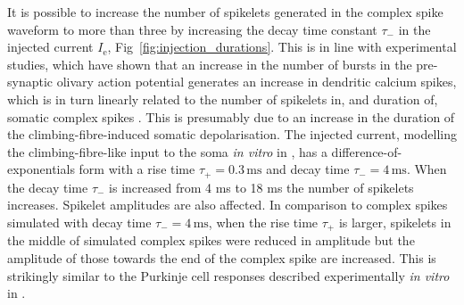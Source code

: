 \documentclass[utf8]{frontiersSCNS} %
\newcommand{\mse}{\,\mathrm{ms}}
\renewcommand{\k}{\mathrm{K}}
\newcommand{\na}{\mathrm{Na}}
\newcommand{\leak}{\mathrm{l}}
\begin{document}

It is possible to increase the
number of spikelets generated in the complex spike waveform to more
than three by increasing the decay time constant $\tau_-$ in the
injected current $I_{\mathrm{e}}$, Fig~\ref{fig:injection_durations}. This is in line with experimental studies, which have shown that an increase in the number of bursts in the pre-synaptic olivary action potential generates an increase in dendritic calcium spikes, which is in turn linearly related to the number of spikelets in, and duration of, somatic complex spikes \cite{MathyEtAl2009}. This is presumably due to an increase in the duration of the climbing-fibre-induced somatic depolarisation.
The injected current, modelling the climbing-fibre-like input to the soma
\textsl{in vitro} in \cite{DavieEtAl2008}, has a
difference-of-exponentials form with a rise time $\tau_+=0.3\mse$ and
decay time $\tau_-=4\mse$. When the decay time $\tau_-$ is increased
from 4 ms to 18 ms the number of spikelets increases. Spikelet
amplitudes are also affected. In comparison to complex spikes
simulated with decay time $\tau_- = 4\mse$, when the rise time
$\tau_+$ is larger, spikelets in the middle of simulated complex
spikes were reduced in amplitude but the amplitude of those towards
the end of the complex spike are increased.  This is strikingly
similar to the Purkinje cell responses described experimentally
\textsl{in vitro} in \cite{MonsivaisEtAl2005}.

\end{document}
